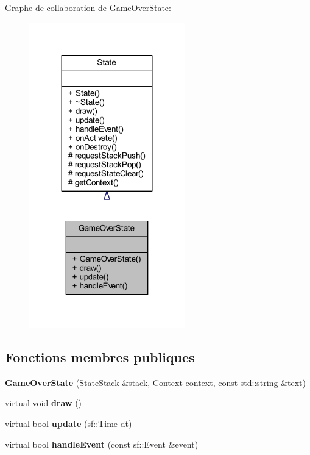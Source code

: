 Graphe de collaboration de Game\+Over\+State\+:\nopagebreak
\begin{figure}[H]
\begin{center}
\leavevmode
\includegraphics[width=191pt]{class_game_over_state__coll__graph}
\end{center}
\end{figure}
\subsection*{Fonctions membres publiques}
\begin{DoxyCompactItemize}
\item 
\hypertarget{class_game_over_state_a025337813b515023e9bbce92af1c08eb}{}\label{class_game_over_state_a025337813b515023e9bbce92af1c08eb} 
{\bfseries Game\+Over\+State} (\hyperlink{class_state_stack}{State\+Stack} \&stack, \hyperlink{struct_state_1_1_context}{Context} context, const std\+::string \&text)
\item 
\hypertarget{class_game_over_state_a9decc1411647e390bfed0bdc009cd691}{}\label{class_game_over_state_a9decc1411647e390bfed0bdc009cd691} 
virtual void {\bfseries draw} ()
\item 
\hypertarget{class_game_over_state_a8a2047b5c684965f33574b8aee7b7c8f}{}\label{class_game_over_state_a8a2047b5c684965f33574b8aee7b7c8f} 
virtual bool {\bfseries update} (sf\+::\+Time dt)
\item 
\hypertarget{class_game_over_state_acf1dc2c7f58fe21b7cfababaf87ff20b}{}\label{class_game_over_state_acf1dc2c7f58fe21b7cfababaf87ff20b} 
virtual bool {\bfseries handle\+Event} (const sf\+::\+Event \&event)
\end{DoxyCompactItemize}
